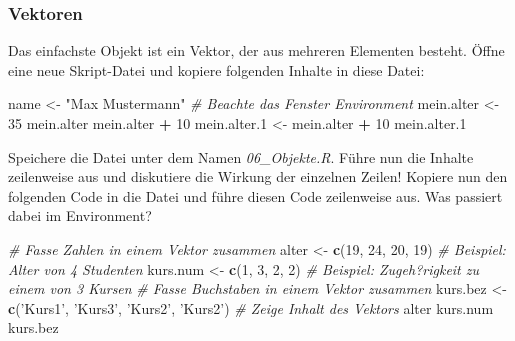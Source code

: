 \documentclass[]{article}
\newenvironment{Shaded}{\begin{snugshade}}{\end{snugshade}}
\newcommand{\KeywordTok}[1]{\textcolor[rgb]{0.13,0.29,0.53}{\textbf{#1}}}
\newcommand{\DecValTok}[1]{\textcolor[rgb]{0.00,0.00,0.81}{#1}}
\newcommand{\StringTok}[1]{\textcolor[rgb]{0.31,0.60,0.02}{#1}}
\newcommand{\CommentTok}[1]{\textcolor[rgb]{0.56,0.35,0.01}{\textit{#1}}}
\newcommand{\OperatorTok}[1]{\textcolor[rgb]{0.81,0.36,0.00}{\textbf{#1}}}
\newcommand{\NormalTok}[1]{#1}
\begin{document}
\subsubsection*{Vektoren}\label{vektoren}

Das einfachste Objekt ist ein Vektor, der aus mehreren Elementen
besteht. Öffne eine neue Skript-Datei und kopiere folgenden Inhalte in
diese Datei:

\begin{Shaded}
\begin{Highlighting}[]
\NormalTok{  name       <-}\StringTok{ "Max Mustermann"} \CommentTok{# Beachte das Fenster Environment}
\NormalTok{  mein.alter <-}\StringTok{ }\DecValTok{35}
\NormalTok{  mein.alter}
\NormalTok{  mein.alter }\OperatorTok{+}\StringTok{ }\DecValTok{10}
\NormalTok{  mein.alter.}\DecValTok{1}\NormalTok{ <-}\StringTok{ }\NormalTok{mein.alter }\OperatorTok{+}\StringTok{ }\DecValTok{10}
\NormalTok{  mein.alter.}\DecValTok{1}
\end{Highlighting}
\end{Shaded}

Speichere die Datei unter dem Namen \emph{06\_Objekte.R}. Führe nun die
Inhalte zeilenweise aus und diskutiere die Wirkung der einzelnen Zeilen!
Kopiere nun den folgenden Code in die Datei und führe diesen Code
zeilenweise aus. Was passiert dabei im Environment?

\begin{Shaded}
\begin{Highlighting}[]
  \CommentTok{# Fasse Zahlen in einem Vektor zusammen}
\NormalTok{    alter    <-}\StringTok{ }\KeywordTok{c}\NormalTok{(}\DecValTok{19}\NormalTok{, }\DecValTok{24}\NormalTok{, }\DecValTok{20}\NormalTok{, }\DecValTok{19}\NormalTok{) }\CommentTok{# Beispiel: Alter von 4 Studenten}
\NormalTok{    kurs.num <-}\StringTok{ }\KeywordTok{c}\NormalTok{(}\DecValTok{1}\NormalTok{, }\DecValTok{3}\NormalTok{, }\DecValTok{2}\NormalTok{, }\DecValTok{2}\NormalTok{) }\CommentTok{# Beispiel: Zugeh?rigkeit zu einem von 3 Kursen}
  \CommentTok{# Fasse Buchstaben in einem Vektor zusammen}
\NormalTok{    kurs.bez <-}\StringTok{ }\KeywordTok{c}\NormalTok{(}\StringTok{'Kurs1'}\NormalTok{, }\StringTok{'Kurs3'}\NormalTok{, }\StringTok{'Kurs2'}\NormalTok{, }\StringTok{'Kurs2'}\NormalTok{)}
  \CommentTok{# Zeige Inhalt des Vektors}
\NormalTok{    alter}
\NormalTok{    kurs.num}
\NormalTok{    kurs.bez}
\end{Highlighting}
\end{Shaded}
\end{document}
